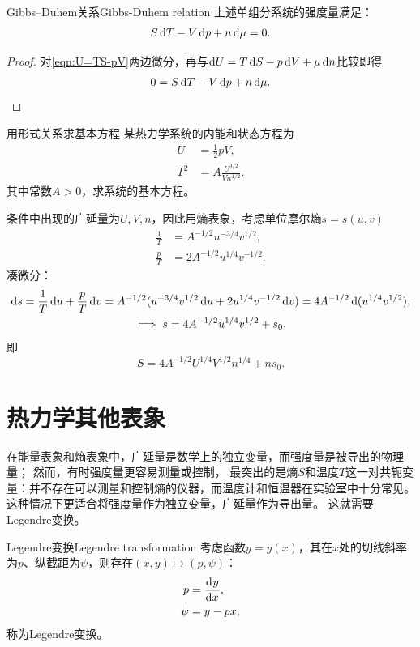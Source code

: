 \begin{theorem}
	{Gibbs--Duhem关系}{Gibbs-Duhem relation}
	上述单组分系统的强度量满足：
	\begin{equation}
		S\mathop{}\!\mathrm{d} T - V\mathop{}\!\mathrm{d} p + n\mathop{}\!\mathrm{d}\mu = 0.
	\end{equation}
\end{theorem}

\begin{proof}
	对\eqref{eqn:U=TS-pV}两边微分，再与$\mathop{}\!\mathrm{d} U = T\mathop{}\!\mathrm{d} S - p\mathop{}\!\mathrm{d} V + \mu\mathop{}\!\mathrm{d} n$比较即得
	\[
		0 = S\mathop{}\!\mathrm{d} T - V\mathop{}\!\mathrm{d} p + n\mathop{}\!\mathrm{d}\mu.
		\qedhere
	\]
\end{proof}

\begin{example}{用形式关系求基本方程}{}
	某热力学系统的内能和状态方程为
	\begin{align*}
		U &= \frac12pV,\\
		T^2 &= A\frac{U^{3/2}}{Vn^{1/2}}.
	\end{align*}
	其中常数$A > 0$，求系统的基本方程。

	条件中出现的广延量为$U,V,n$，因此用熵表象，考虑单位摩尔熵$s = s(u,v)$
	\begin{align*}
		\frac1T &= A^{-1/2}u^{-3/4}v^{1/2},\\
		\frac pT &= 2A^{-1/2}u^{1/4}v^{-1/2}.
	\end{align*}
	凑微分：
	\begin{gather*}
		\mathop{}\!\mathrm{d} s = \frac1T\mathop{}\!\mathrm{d} u + \frac pT\mathop{}\!\mathrm{d} v = A^{-1/2}(u^{-3/4}v^{1/2}\mathop{}\!\mathrm{d} u + 2u^{1/4}v^{-1/2}\mathop{}\!\mathrm{d} v) = 4A^{-1/2}\mathop{}\!\mathrm{d}(u^{1/4}v^{1/2}),\\
		\implies
		s = 4A^{-1/2}u^{1/4}v^{1/2} + s_0,
	\end{gather*}
	即
	\[
		S = 4A^{-1/2}U^{1/4}V^{1/2}n^{1/4} + ns_0.
	\]
\end{example}

\section{热力学其他表象}

在能量表象和熵表象中，广延量是数学上的独立变量，而强度量是被导出的物理量；%
然而，有时强度量更容易测量或控制，
最突出的是熵$S$和温度$T$这一对共轭变量：并不存在可以测量和控制熵的仪器，而温度计和恒温器在实验室中十分常见。
这种情况下更适合将强度量作为独立变量，广延量作为导出量。
这就需要Legendre变换。


\begin{theorem}
	{Legendre变换}{Legendre transformation}
	考虑函数$y = y(x)$，其在$x$处的切线斜率为$p$、纵截距为$\psi$，则存在$(x,y) \mapsto (p,\psi)$：
	\begin{subequations}
		\label{eqn:Legendre transformation}
		\begin{align}
			p &= \frac{\mathop{}\!\mathrm{d}^{}y}{\mathrm{d}{x}^{}},\\
			\psi &= y - px,
		\end{align}
	\end{subequations}
	称为Legendre变换。
	\begin{notecaptionblock}
		\label{fig:Legendre transform}
	\end{notecaptionblock}
\end{theorem}

